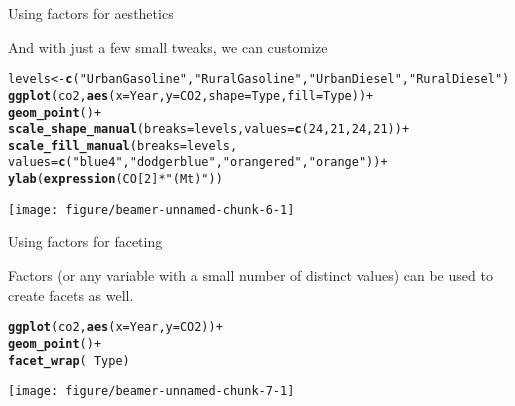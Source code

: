 \documentclass[table]{beamer}\usepackage[]{graphicx}\usepackage[]{color}
\makeatletter
\def\maxwidth{ %
  \ifdim\Gin@nat@width>\linewidth
    \linewidth
  \else
    \Gin@nat@width
  \fi
}
\newcommand{\hlnum}[1]{\textcolor[rgb]{0.686,0.059,0.569}{#1}}%
\newcommand{\hlstr}[1]{\textcolor[rgb]{0.192,0.494,0.8}{#1}}%
\newcommand{\hlopt}[1]{\textcolor[rgb]{0,0,0}{#1}}%
\newcommand{\hlstd}[1]{\textcolor[rgb]{0.345,0.345,0.345}{#1}}%
\newcommand{\hlkwb}[1]{\textcolor[rgb]{0.69,0.353,0.396}{#1}}%
\newcommand{\hlkwc}[1]{\textcolor[rgb]{0.333,0.667,0.333}{#1}}%
\newcommand{\hlkwd}[1]{\textcolor[rgb]{0.737,0.353,0.396}{\textbf{#1}}}%
\newenvironment{kframe}{%
 \def\at@end@of@kframe{}%
 \ifinner\ifhmode%
  \def\at@end@of@kframe{\end{minipage}}%
  \begin{minipage}{\columnwidth}%
 \fi\fi%
 \def\FrameCommand##1{\hskip\@totalleftmargin \hskip-\fboxsep
 \colorbox{shadecolor}{##1}\hskip-\fboxsep
     \hskip-\linewidth \hskip-\@totalleftmargin \hskip\columnwidth}%
 \MakeFramed {\advance\hsize-\width
   \@totalleftmargin\z@ \linewidth\hsize
   \@setminipage}}%
 {\par\unskip\endMakeFramed%
 \at@end@of@kframe}
\newenvironment{knitrout}{}{} %
\makeatother
\begin{document}

\begin{frame}[fragile]{Using factors for aesthetics}

And with just a few small tweaks, we can customize

\begin{knitrout}\tiny
{}\color{fgcolor}\begin{kframe}
\begin{alltt}
\hlstd{levels} \hlkwb{<-} \hlkwd{c}\hlstd{(}\hlstr{"Urban Gasoline"}\hlstd{,} \hlstr{"Rural Gasoline"}\hlstd{,} \hlstr{"Urban Diesel"}\hlstd{,} \hlstr{"Rural Diesel"}\hlstd{)}
\hlkwd{ggplot}\hlstd{(co2,} \hlkwd{aes}\hlstd{(}\hlkwc{x} \hlstd{= Year,} \hlkwc{y} \hlstd{= CO2,} \hlkwc{shape} \hlstd{= Type,} \hlkwc{fill} \hlstd{= Type))} \hlopt{+}
  \hlkwd{geom_point}\hlstd{()} \hlopt{+}
  \hlkwd{scale_shape_manual}\hlstd{(}\hlkwc{breaks}\hlstd{=levels,} \hlkwc{values}\hlstd{=}\hlkwd{c}\hlstd{(}\hlnum{24}\hlstd{,} \hlnum{21}\hlstd{,} \hlnum{24}\hlstd{,} \hlnum{21}\hlstd{))} \hlopt{+}
  \hlkwd{scale_fill_manual}\hlstd{(}\hlkwc{breaks} \hlstd{= levels,}
                    \hlkwc{values}\hlstd{=}\hlkwd{c}\hlstd{(}\hlstr{"blue4"}\hlstd{,} \hlstr{"dodgerblue"}\hlstd{,} \hlstr{"orangered"}\hlstd{,} \hlstr{"orange"}\hlstd{))} \hlopt{+}
  \hlkwd{ylab}\hlstd{(}\hlkwd{expression}\hlstd{(CO[}\hlnum{2}\hlstd{]}\hlopt{*}\hlstr{" (Mt)"}\hlstd{))}
\end{alltt}
\end{kframe}

{\centering \texttt{[image: figure/beamer-unnamed-chunk-6-1]} 

}


\end{knitrout}

\end{frame}


\begin{frame}[fragile]{Using factors for faceting}

Factors (or any variable with a small number of distinct values) can be used to create facets as well.

\begin{knitrout}\tiny
{}\color{fgcolor}\begin{kframe}
\begin{alltt}
\hlkwd{ggplot}\hlstd{(co2,} \hlkwd{aes}\hlstd{(}\hlkwc{x} \hlstd{= Year,} \hlkwc{y} \hlstd{= CO2))} \hlopt{+}
  \hlkwd{geom_point}\hlstd{()} \hlopt{+}
  \hlkwd{facet_wrap}\hlstd{(}\hlopt{~}\hlstd{Type)}
\end{alltt}
\end{kframe}

{\centering \texttt{[image: figure/beamer-unnamed-chunk-7-1]} 

}


\end{knitrout}

\end{frame}
\end{document}
